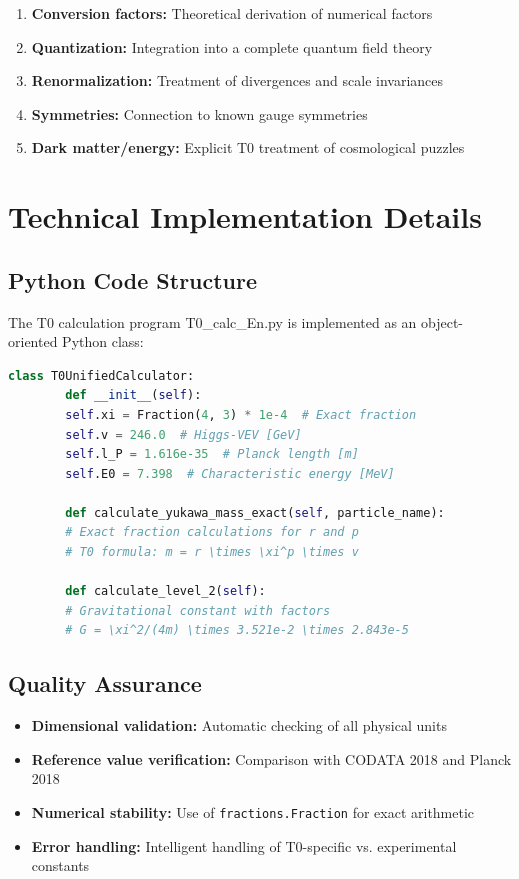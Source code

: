 	\begin{enumerate}
		\item \textbf{Conversion factors:} Theoretical derivation of numerical factors
		\item \textbf{Quantization:} Integration into a complete quantum field theory
		\item \textbf{Renormalization:} Treatment of divergences and scale invariances
		\item \textbf{Symmetries:} Connection to known gauge symmetries
		\item \textbf{Dark matter/energy:} Explicit T0 treatment of cosmological puzzles
	\end{enumerate}
	
	\section{Technical Implementation Details}
	
	\subsection{Python Code Structure}
	
	The T0 calculation program T0\_calc\_En.py is implemented as an object-oriented Python class:
	
	\begin{lstlisting}[language=Python, basicstyle=\small\ttfamily]
		class T0UnifiedCalculator:
		def __init__(self):
		self.xi = Fraction(4, 3) * 1e-4  # Exact fraction
		self.v = 246.0  # Higgs-VEV [GeV]
		self.l_P = 1.616e-35  # Planck length [m]
		self.E0 = 7.398  # Characteristic energy [MeV]
		
		def calculate_yukawa_mass_exact(self, particle_name):
		# Exact fraction calculations for r and p
		# T0 formula: m = r \times \xi^p \times v
		
		def calculate_level_2(self):
		# Gravitational constant with factors
		# G = \xi^2/(4m) \times 3.521e-2 \times 2.843e-5
	\end{lstlisting}
	
	\subsection{Quality Assurance}
	
	\begin{itemize}
		\item \textbf{Dimensional validation:} Automatic checking of all physical units
		\item \textbf{Reference value verification:} Comparison with CODATA 2018 and Planck 2018
		\item \textbf{Numerical stability:} Use of \texttt{fractions.Fraction} for exact arithmetic
		\item \textbf{Error handling:} Intelligent handling of T0-specific vs. experimental constants
	\end{itemize}
	
